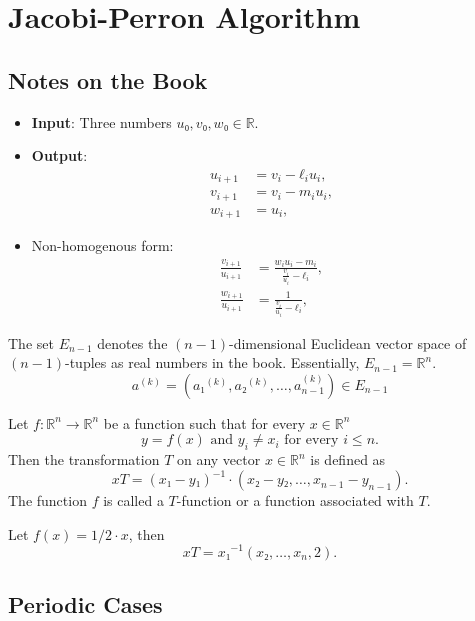 \chapter{Jacobi-Perron Algorithm}

\section{Notes on the Book}

\begin{itemize}
  \item
    \textbf{Input}: Three numbers $u₀, v₀, w₀ ∈ ℝ$.
  \item
    \textbf{Output}:
    \begin{align*}
      u_{i + 1} &= v_i - ℓ_i u_i, \\
      v_{i + 1} &= v_i - m_i u_i, \\
      w_{i + 1} &= u_i,
    \end{align*}
  \item Non-homogenous form:
    \begin{align*}
      \frac{v_{i+1}}{u_{i+1}} & = \frac{{w_i}{u_i} - m_i}{\frac{v_i}{u_i} - ℓ_i}, \\
      \frac{w_{i+1}}{u_{i+1}} & = \frac{1}{\frac{v_i}{u_i} - ℓ_i},
    \end{align*}
\end{itemize}

The set $E_{n-1}$ denotes the $(n-1)$-dimensional Euclidean vector space of
$(n-1)$-tuples as real numbers in the book.
Essentially, $E_{n-1} = ℝ^n$.
\[
  a^{(k)} = (a₁^{(k)}, a₂^{(k)}, \dots, a_{n-1}^{(k)}) ∈ E_{n-1}
\]

\begin{definition}
  Let $f \colon ℝ^n → ℝ^n$ be a function such that for every $x ∈ ℝ^n$
  \[
    y = f(x) \text{ and } y_i ≠ x_i \text{ for every } i ≤ n.
  \]
  Then the transformation $T$ on any vector $x ∈ ℝ^n$ is defined as
  \[
    x T = (x₁ - y₁)^{-1} · (x₂ - y₂, \dots, x_{n-1} - y_{n-1}).
  \]
  The function $f$ is called a $T$-function or a function associated with $T$.
\end{definition}

\begin{example}
  Let $f(x) = 1/2 · x$, then
  \[
    x T = x₁^{-1} (x₂, \dots, x_n, 2).
  \]
\end{example}

\section{Periodic Cases}

